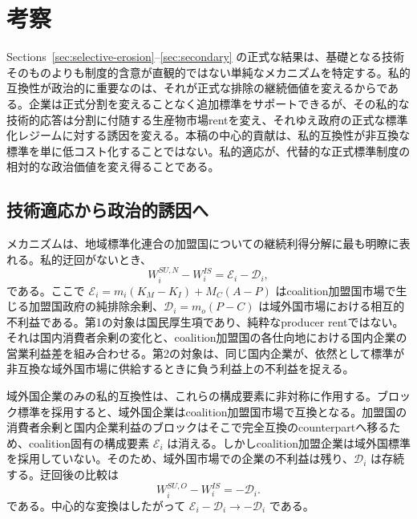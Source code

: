 \section{考察}
\label{sec:discussion}

Sections~\ref{sec:selective-erosion}--\ref{sec:secondary} の正式な結果は、基礎となる技術そのものよりも制度的含意が直観的ではない単純なメカニズムを特定する。私的互換性が政治的に重要なのは、それが正式な排除の継続価値を変えるからである。企業は正式分割を変えることなく追加標準をサポートできるが、その私的な技術的応答は分割に付随する生産物市場rentを変え、それゆえ政府の正式な標準化レジームに対する誘因を変える。本稿の中心的貢献は、私的互換性が非互換な標準を単に低コスト化することではない。私的適応が、代替的な正式標準制度の相対的な政治価値を変え得ることである。

\subsection{技術適応から政治的誘因へ}
\label{subsec:discussion-mechanism}

メカニズムは、地域標準化連合の加盟国についての継続利得分解に最も明瞭に表れる。私的迂回がないとき、
\begin{equation}
    W_i^{SU,N}-W_i^{IS}
    =\mathscr E_i-\mathscr D_i,
    \label{eq:discussion-before}
\end{equation}
である。ここで $\mathscr E_i=m_i(K_M-K_I)+M_C(A-P)$ はcoalition加盟国市場で生じる加盟国政府の純排除余剰、$\mathscr D_i=m_o(P-C)$ は域外国市場における相互的不利益である。第1の対象は国民厚生項であり、純粋なproducer rentではない。それは国内消費者余剰の変化と、coalition加盟国の各仕向地における国内企業の営業利益差を組み合わせる。第2の対象は、同じ国内企業が、依然として標準が非互換な域外国市場に供給するときに負う利益上の不利益を捉える。

域外国企業のみの私的互換性は、これらの構成要素に非対称に作用する。ブロック標準を採用すると、域外国企業はcoalition加盟国市場で互換となる。加盟国の消費者余剰と国内企業利益のブロックはそこで完全互換のcounterpartへ移るため、coalition固有の構成要素 $\mathscr E_i$ は消える。しかしcoalition加盟企業は域外国標準を採用していない。そのため、域外国市場での企業の不利益は残り、$\mathscr D_i$ は存続する。迂回後の比較は
\begin{equation}
    W_i^{SU,O}-W_i^{IS}
    =-\mathscr D_i.
    \label{eq:discussion-after}
\end{equation}
である。中心的な変換はしたがって $\mathscr E_i-\mathscr D_i\rightarrow-\mathscr D_i$ である。

